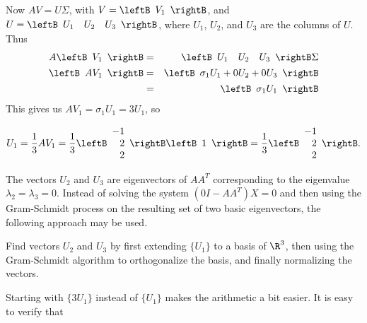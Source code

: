 \begin{solution}
Now $AV=U\Sigma$, with
$V=\leftB\begin{array}{r} V_1 \end{array}\rightB$,
and $U=\leftB\begin{array}{rrr} U_1 & U_2 & U_3 \end{array}\rightB$,
where $U_1$, $U_2$, and $U_3$ are the columns of $U$.
Thus
\begin{eqnarray*}
A\leftB\begin{array}{r} V_1 \end{array}\rightB
&=& \leftB\begin{array}{rrr} U_1 & U_2 & U_3 \end{array}\rightB\Sigma\\
\leftB\begin{array}{r} AV_1 \end{array}\rightB
&=& \leftB\begin{array}{r} \sigma_1 U_1+0U_2+0U_3 \end{array}\rightB\\
&=& \leftB\begin{array}{r} \sigma_1 U_1 \end{array}\rightB
\end{eqnarray*}
This gives us $AV_1=\sigma_1 U_1= 3U_1$, so

\[ U_1 = \frac{1}{3}AV_1 
= \frac{1}{3}
\leftB\begin{array}{r} -1 \\ 2 \\ 2 \end{array}\rightB
\leftB\begin{array}{r} 1 \end{array}\rightB
= \frac{1}{3}
\leftB\begin{array}{r} -1 \\ 2 \\ 2 \end{array}\rightB.\]

The vectors $U_2$ and $U_3$ are eigenvectors of $AA^T$ corresponding
to the eigenvalue $\lambda_2=\lambda_3=0$.
Instead of solving the system $(0I-AA^T)X= 0$ and then using the
Gram-Schmidt process on the resulting set of
two basic eigenvectors, the following approach may be used.


Find vectors $U_2$ and $U_3$ by first extending $\{ U_1\}$ to a basis of
$\R^3$, then using the Gram-Schmidt algorithm to orthogonalize the basis,
and finally normalizing the vectors.

Starting with $\{ 3U_1 \}$ instead of $\{ U_1 \}$ makes the
arithmetic a bit easier.
It is easy to verify that


\end{solution}

